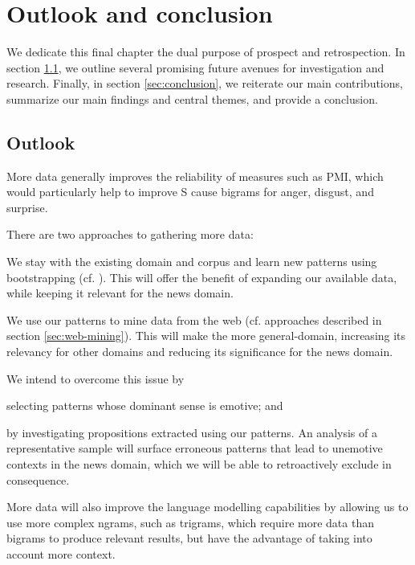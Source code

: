 
\chapter{Outlook and conclusion} %

\label{ch:outlook-conclusion}

We dedicate this final chapter the dual purpose of prospect and retrospection. In section \ref{sec:outlook}, we outline several promising future avenues for investigation and research. Finally, in section \ref{sec:conclusion}, we reiterate our main contributions, summarize our main findings and central themes, and provide a conclusion.

\section{Outlook} \label{sec:outlook}

More data generally improves the reliability of measures such as PMI, which would particularly help to improve S cause bigrams for anger, disgust, and surprise. \begin{inparaenum} There are two approaches to gathering more data: \item We stay with the existing domain and corpus and learn new patterns using bootstrapping (cf. \cite{harvesting_ontologizing}). This will offer the benefit of expanding our available data, while keeping it relevant for the news domain. \item We use our patterns to mine data from the web  (cf. approaches described in section \ref{sec:web-mining}). This will make the more general-domain, increasing its relevancy for other domains and reducing its significance for the news domain. \end{inparaenum}

\begin{inparaenum} We intend to overcome this issue by \item selecting patterns whose dominant sense is emotive; and \item by investigating propositions extracted using our patterns. An analysis of a representative sample will surface erroneous patterns that lead to unemotive contexts in the news domain, which we will be able to retroactively exclude in consequence. \end{inparaenum}

More data will also improve the language modelling capabilities by allowing us to use more complex ngrams, such as trigrams, which require more data than bigrams to produce relevant results, but have the advantage of taking into account more context.

